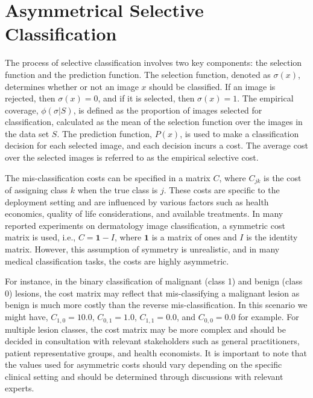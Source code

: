 \section{Asymmetrical Selective Classification}
\label{sec:selective_classification}
The process of selective classification involves two key components: the selection function and the prediction function. The selection function, denoted as $\sigma(x)$, determines whether or not an image $x$ should be classified. If an image is rejected, then $\sigma(x)=0$, and if it is selected, then $\sigma(x)=1$. The empirical coverage, $\phi(\sigma|S)$, is defined as the proportion of images selected for classification, calculated as the mean of the selection function over the images in the data set $S$. The prediction function, $P(x)$, is used to make a classification decision for each selected image, and each decision incurs a cost. The average cost over the selected images is referred to as the empirical selective cost.

The mis-classification costs can be specified in a matrix $C$, where $C_{jk}$ is the cost of assigning class $k$ when the true class is $j$. These costs are specific to the deployment setting and are influenced by various factors such as health economics, quality of life considerations, and available treatments. In many reported experiments on dermatology image classification, a symmetric cost matrix is used, i.e., $C = \mathbf{1} - I$, where $\mathbf{1}$ is a matrix of ones and $I$ is the identity matrix. However, this assumption of symmetry is unrealistic, and in many medical classification tasks, the costs are highly asymmetric.

For instance, in the binary classification of malignant (class 1) and benign (class 0) lesions, the cost matrix may reflect that mis-classifying a malignant lesion as benign is much more costly than the reverse mis-classification. In this scenario we might have, $C_{1,0} = 10.0$, $C_{0,1} = 1.0$, $C_{1,1} = 0.0$, and $C_{0,0} = 0.0$ for example. For multiple lesion classes, the cost matrix may be more complex and should be decided in consultation with relevant stakeholders such as general practitioners, patient representative groups, and health economists. It is important to note that the values used for asymmetric costs should vary depending on the specific clinical setting and should be determined through discussions with relevant experts.

